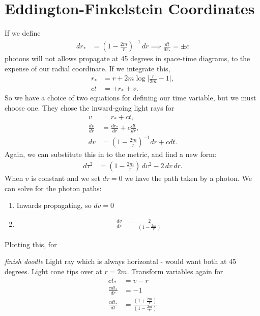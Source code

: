\documentclass[a4paper, 11pt, normalem]{report}
\begin{document}
\section{Eddington-Finkelstein Coordinates}
If we define 
\begin{align}
    dr_{*} &= \left(1-\frac{2m}{r}\right)^{-1}\,dr \implies \frac{dt}{dr_{*}} = \pm c
\end{align}
photons will not allows propagate at 45 degrees in space-time diagrams, to the expense of our radial coordinate.
If we integrate this,
\begin{align}
    r_{*} &= r + 2m\log\bigg|\frac{r}{2m}-1\bigg|, \\
    ct &= \pm r_{*} + v.
\end{align}
So we have a choice of two equations for defining our time variable, but we must choose one. 
They chose the inward-going light rays for
\begin{align}
    v &= r_{*} + ct, \\
    \frac{dv}{dr} &= \frac{dr_{*}}{dr} + c\frac{dt}{dr}, \\
    dv &= \left(1-\frac{2m}{r}\right)^{-1}dr + cdt.
\end{align}
Again, we can substitute this in to the metric, and find a new form:
\begin{align}
    d\tau^2 &= \left(1-\frac{2m}{r}\right)\,dv^2 - 2\,dv\,dr.
\end{align}
When $v$ is constant and we set $d\tau=0$ we have the path taken by a photon. 
We can solve for the photon paths:
\begin{enumerate}
    \item Inwards propagating, so $dv = 0$ 
    \item 
        \begin{align}
            \frac{dv}{dr} &= \frac{2}{\left(1-\frac{2m}{r}\right)}
        \end{align}
\end{enumerate}
Plotting this, for
\begin{figure}[H]
    \centering
\end{figure}
\emph{finish doodle}
Light ray which is always horizontal - would want both at 45 degrees.
Light cone tips over at $r=2m$.
Transform variables again for
\begin{align}
    ct_{*} &= v-r \\
    \frac{cdt_{*}}{dr} &= -1 \\
    \frac{cdt_{*}}{dt} &= \frac{\left(1+\frac{2m}{r}\right)}{\left(1-\frac{2m}{r}\right)}
\end{align}
\end{document}

